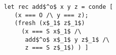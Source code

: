 \begin{figure}[!t]
  \centering
  \begin{minipage}{0.7\columnwidth}
    \begin{lstlisting}[frame=tb]
 let rec add$^o$ x y z = conde [
   (x === O /\ y === z);
   (fresh (x$_1$ z$_1$)
     (x === S x$_1$ /\
      add$^o$ x$_1$ y z$_1$ /\
      z === S z$_1$) ) ]
    \end{lstlisting}
  \end{minipage}
\end{figure}